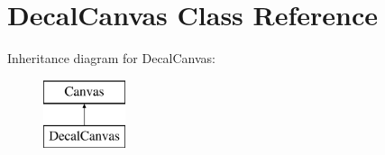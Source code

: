 \hypertarget{class_decal_canvas}{\section{Decal\-Canvas Class Reference}
\label{class_decal_canvas}
}
Inheritance diagram for Decal\-Canvas\-:\begin{figure}[H]
\begin{center}
\leavevmode
\includegraphics[height=2.000000cm]{class_decal_canvas}
\end{center}
\end{figure}
